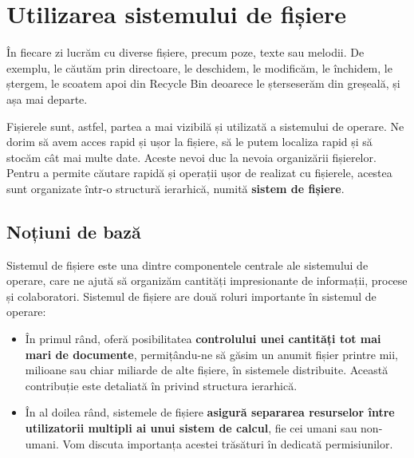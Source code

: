 
\chapter{Utilizarea sistemului de fișiere}
\label{ch:fs}

În fiecare zi lucrăm cu diverse fișiere, precum poze, texte sau melodii.
De exemplu, le căutăm prin directoare, le deschidem, le modificăm, le închidem, le ștergem, le scoatem apoi din Recycle Bin deoarece le șterseserăm din greșeală, și așa mai departe.

Fișierele sunt, astfel, partea a mai vizibilă și utilizată a sistemului de operare.
Ne dorim să avem acces rapid și ușor la fișiere, să le putem localiza rapid și să stocăm cât mai multe date.
Aceste nevoi duc la nevoia organizării fișierelor.
Pentru a permite căutare rapidă și operații ușor de realizat cu fișierele, acestea sunt organizate într-o structură ierarhică, numită \textbf{sistem de fișiere}.

\section{Noțiuni de bază}
\label{sec:fs:concepts}

Sistemul de fișiere este una dintre componentele centrale ale sistemului de operare, care ne ajută să organizăm cantități impresionante de informații, procese și colaboratori.
Sistemul de fișiere are două roluri importante în sistemul de operare:

\begin{itemize}
  \item În primul rând, oferă posibilitatea \textbf{controlului unei cantități tot mai mari de documente}, permițându-ne să găsim un anumit fișier printre mii, milioane sau chiar miliarde de alte fișiere, în sistemele distribuite.
    Această contribuție este detaliată în  privind structura ierarhică.
  \item În al doilea rând, sistemele de fișiere \textbf{asigură separarea resurselor între utilizatorii multipli ai unui sistem de calcul}, fie cei umani sau non-umani.
    Vom discuta importanța acestei trăsături în  dedicată permisiunilor.
\end{itemize}

